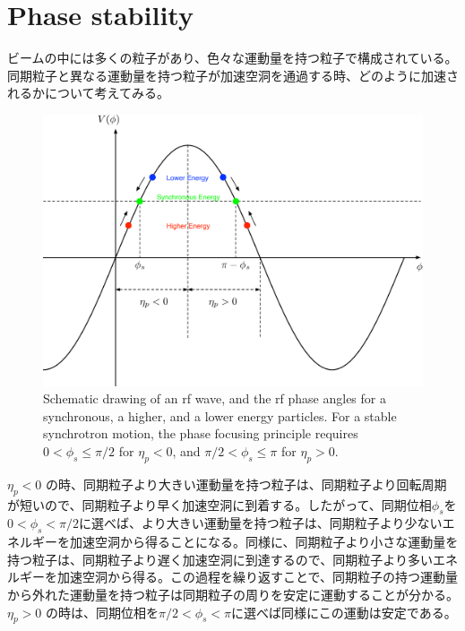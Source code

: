 \documentclass[10pt,a4paper]{ltjsarticle}
\begin{document}
\section{Phase stability}
ビームの中には多くの粒子があり、色々な運動量を持つ粒子で構成されている。同期粒子と異なる運動量を持つ粒子が加速空洞を通過する時、どのように加速されるかについて考えてみる。
%
\begin{figure}[hbt]
    \begin{center}
      \includegraphics[width=15cm,clip]{phase_stability.pdf}
      \caption{Schematic drawing of an rf wave, and the rf phase angles for a synchronous, a higher, and a lower energy particles.
      For a stable synchrotron motion, the phase focusing principle requires $0 < \phi_s \leq \pi/2$ for $\eta_p < 0$,
      and $\pi/2 < \phi_s \leq \pi$ for $\eta_p > 0$.}
      \label{phase_stability}
    \end{center}
\end{figure}

$\eta_p < 0$ の時、同期粒子より大きい運動量を持つ粒子は、同期粒子より回転周期が短いので、同期粒子より早く加速空洞に到着する。したがって、同期位相$\phi_s$を$0<\phi_s<\pi/2$に選べば、より大きい運動量を持つ粒子は、同期粒子より少ないエネルギーを加速空洞から得ることになる。同様に、同期粒子より小さな運動量を持つ粒子は、同期粒子より遅く加速空洞に到達するので、同期粒子より多いエネルギーを加速空洞から得る。この過程を繰り返すことで、同期粒子の持つ運動量から外れた運動量を持つ粒子は同期粒子の周りを安定に運動することが分かる。$\eta_p > 0$ の時は、同期位相を$\pi/2<\phi_s<\pi$に選べば同様にこの運動は安定である。
\end{document}
